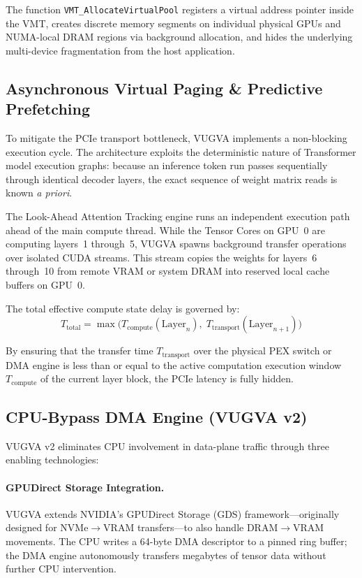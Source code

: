 \documentclass[11pt,twocolumn]{article}
\begin{document}
The function \texttt{VMT\_AllocateVirtualPool} registers a virtual address pointer inside the VMT, creates discrete memory segments on individual physical GPUs and NUMA-local DRAM regions via background allocation, and hides the underlying multi-device fragmentation from the host application.

\subsection{Asynchronous Virtual Paging \& Predictive Prefetching}
\label{sec:prefetch}

To mitigate the PCIe transport bottleneck, VUGVA implements a non-blocking execution cycle. The architecture exploits the deterministic nature of Transformer model execution graphs: because an inference token run passes sequentially through identical decoder layers, the exact sequence of weight matrix reads is known \emph{a priori}.

The Look-Ahead Attention Tracking engine runs an independent execution path ahead of the main compute thread. While the Tensor Cores on GPU~0 are computing layers~1 through~5, VUGVA spawns background transfer operations over isolated CUDA streams. This stream copies the weights for layers~6 through~10 from remote VRAM or system DRAM into reserved local cache buffers on GPU~0.

The total effective compute state delay is governed by:
\begin{equation}
\label{eq:latency_hiding}
T_{\text{total}} = \max\Big(T_{\text{compute}}(\text{Layer}_n),\; T_{\text{transport}}(\text{Layer}_{n+1})\Big)
\end{equation}

By ensuring that the transfer time $T_{\text{transport}}$ over the physical PEX switch or DMA engine is less than or equal to the active computation execution window $T_{\text{compute}}$ of the current layer block, the PCIe latency is fully hidden.

\subsection{CPU-Bypass DMA Engine (VUGVA v2)}
\label{sec:dma}

VUGVA v2 eliminates CPU involvement in data-plane traffic through three enabling technologies:

\paragraph{GPUDirect Storage Integration.}
VUGVA extends NVIDIA's GPUDirect Storage (GDS) framework---originally designed for NVMe$\rightarrow$VRAM transfers---to also handle DRAM$\rightarrow$VRAM movements. The CPU writes a 64-byte DMA descriptor to a pinned ring buffer; the DMA engine autonomously transfers megabytes of tensor data without further CPU intervention.
\end{document}
